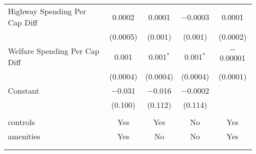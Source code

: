 \begin{table}[!htbp]
\begin{tabular}{@{\extracolsep{5pt}}lcccc}
  Highway Spending Per Cap Diff & 0.0002 & 0.0001 & $-$0.0003 & 0.0001 \\ 
  & (0.0005) & (0.001) & (0.001) & (0.0002) \\ 
  Welfare Spending Per Cap Diff & 0.001 & 0.001$^{*}$ & 0.001$^{*}$ & $-$0.00001 \\ 
  & (0.0004) & (0.0004) & (0.0004) & (0.0001) \\ 
  Constant & $-$0.031 & $-$0.016 & $-$0.0002 &  \\ 
  & (0.100) & (0.112) & (0.114) &  \\ 
 \hline \\[-1.8ex] 
controls & Yes & Yes & No & Yes \\ 
amenities & Yes & No & No & Yes \\ 
\hline \\[-1.8ex] 
\hline 
\hline \\[-1.8ex] 
\end{tabular} 
\end{table} 
